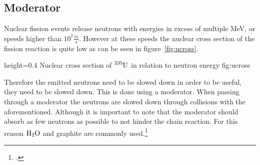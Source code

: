 \pagebreak
\subsection{Moderator}
Nuclear fission events release neutrons with energies in excess of multiple MeV, or speeds higher
than $10^{7} \frac{m}{s}$. However at these speeds the nuclear cross section of the fission reaction
is quite low as can be seen in figure~\ref{fig:ucross}.

  {height=0.4\textheight}%
  {Nuclear cross section of $\ce{^{235}U}$ in relation to neutron energy}%
  {}%
  {fig:ucross}%

  Therefore the emitted neutrons need to be slowed down in order to be useful, they need to be slowed down.
  This is done using a moderator. When passing through a moderator the neutrons are slowed down through
  collisions with the aforementioned. Although it is important to note that the moderator should absorb
  as few neutrons as possible to not hinder the chain reaction. For this reason $\ce{H_{2}O}$ 
  and graphite are commonly used.\footcite[28]{ReactorPhysics}